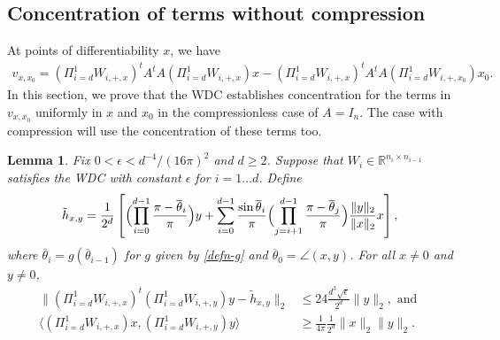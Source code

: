 \documentclass[11pt]{article}
\newtheorem{lemma}[theorem]{Lemma}
\newcommand{\R}{\mathbb{R}}
\newcommand{\eps}{\epsilon}
\newcommand{\thetabar}{\overline{\theta}}
\newcommand{\thetaxy}{\theta_{x,y}}
\newcommand{\alphabarxy}{\overline{\alpha}_{x,y}}
\newcommand{\calN}{\mathcal{N}}
\newcommand{\tran}{t}
\newcommand{\xo}{x_0}
\newcommand{\xhat}{\hat{x}}
\newcommand{\AtA}{A^\tran A}
\newcommand{\hxy}{h_{x,y}}
\newcommand{\htildexy}{\tilde{h}_{x,y}}
\newcommand{\PiWd}{\Pi_{i=d}^1 W_{i,+,x}}
\newcommand{\PiWdy}{\Pi_{i=d}^1 W_{i,+,y}}
\newcommand{\PiWdo}{\Pi_{i=d}^1 W_{i,+,\xo}}
\newcommand{\vxxo}{v_{x, \xo}}
\begin{document}
\subsection{Concentration of terms without compression} \label{sec:concentration-no-compression}

At points of differentiability $x$, we  have 
\begin{align*}
\vxxo =(\PiWd)^t \AtA (\PiWd) x -  (\PiWd)^t \AtA (\PiWdo) \xo.
\end{align*} 
In this section, we prove that the WDC establishes concentration for the terms in $\vxxo$ uniformly in $x$ and $\xo$ in the compressionless case of $A = I_n$.  The case with compression will use the concentration of these terms too.

\begin{lemma}\label{lemma:Gradient-multilayer-concentration} 
Fix $0 < \eps <  d^{-4}/(16 \pi)^2$ and $d \geq 2$.    
Suppose that $W_i \in \R^{n_i \times n_{i-1}}$ satisfies the WDC with constant $\eps$ for $i = 1\ldots d$.
Define
\[
\htildexy =  \frac{1}{2^d} \left[ \Bigl( \prod_{i=0}^{d-1} \frac{\pi - \thetabar_i}{\pi}  \Bigr)y 
+ \sum_{i=0}^{d-1} \frac{\sin \thetabar_i}{\pi}  \Bigl( \prod_{j=i+1}^{d-1} \frac{\pi - \thetabar_j}{\pi}  \Bigr)  \frac{\|y\|_2}{\|x\|_2} x  \right],
\] 
where $\bar{\theta}_i = g(\thetabar_{i-1})$ for $g$ given by \eqref{defn-g} and $\thetabar_0 = \angle(x,y)$.  For all $x \neq 0$ and $y \neq 0$, 
\begin{align}
\|( \PiWd)^t ( \PiWdy) y - \htildexy  \|_2 &\leq 24 \frac{d^3 \sqrt{\eps}}{2^{d}} \|y\|_2, \text{ and } \label{vxyhxy-d-cubed}  \\
\bigl \langle  (\PiWd) x, ( \PiWdy) y \bigr \rangle  &\geq \frac{1}{4 \pi} \frac{1}{2^d} \|x\|_2 \|y\|_2. \label{piwxpiwyy-lowerbound}
\end{align}
\end{lemma}
\end{document}
